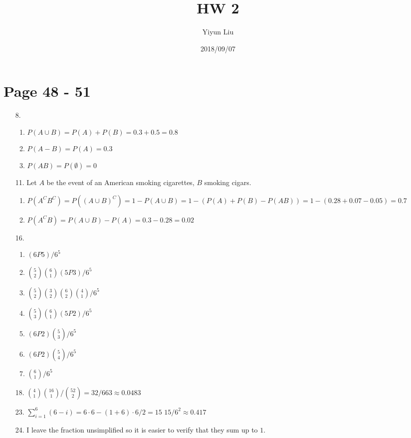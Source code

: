 \documentclass{article}
\title{HW 2}
\date{2018/09/07}
\author{Yiyun Liu}
\begin{document}
\maketitle
\lstset{basicstyle=\ttfamily}

\section*{Page 48 - 51}
\begin{itemize}
\item [8.]
  \begin{enumerate}[label=(\alph*)]
  \item \(P(A \cup B) = P(A)+P(B)=0.3+0.5=0.8\)
  \item \(P(A - B) = P(A) = 0.3\)
  \item \(P(AB)=P(\emptyset)=0\)
  \end{enumerate}
\item [11.]
  Let $A$ be the event of an American smoking cigarettes, $B$ smoking
  cigars.
  \begin{enumerate}[label=(\alph*)]
  \item $P(A^CB^C)=P((A\cup B)^C)=1-P(A\cup B)=1-(P(A)+P(B)-P(AB))=1-(0.28+0.07-0.05)=0.7$
  \item $P(A^CB)=P(A\cup B) - P(A) = 0.3 - 0.28 = 0.02$
  \end{enumerate}
\item [16.]
  \begin{enumerate}[label=(\alph*)]
  \item $(6P5)/6^5$
  \item ${5 \choose 2}{6 \choose 1}(5P3)/6^5$
  \item ${5 \choose 2}{3 \choose 2}{6 \choose 2}{4 \choose 1} / 6^5$
  \item ${5 \choose 3}{6 \choose 1}(5P2)/6^5$
  \item $(6P2){5 \choose 3}/6^5$
  \item $(6P2){5 \choose 4}/6^5$
  \item ${6 \choose 1}/6^5$
  \end{enumerate}
\item [18.]
  ${4 \choose 1}{16 \choose 1}/ {52 \choose 2}=32/663\approx 0.0483$
\item [23.]
  $\sum_{i=1}^{6}(6-i) = 6\cdot6 - (1+6)\cdot6/2 = 15$
  $15/6^2 \approx 0.417$
\item [24.]
  I leave the fraction unsimplified so it is easier to verify that
  they sum up to $1$.\\
  \begin{tabular}{c | c}

\end{tabular}
\end{itemize}
\end{document}
